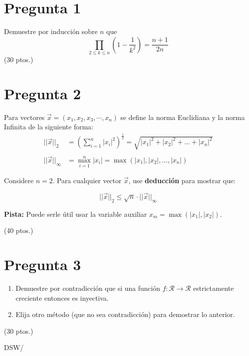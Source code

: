 \documentclass[spanish, fleqn]{article}
\title{Estructuras Discretas \\
       Tarea \#\num \\
       ``Demuestre que sabe demostrar''}
\author{Discrete Structure Warriors}
\date{}
\begin{document}
\maketitle
\thispagestyle{empty}

\section*{Pregunta 1}
Demuestre por inducción sobre \(n\) que
\[
\prod_{2 \leq k \leq n} \left( 1 - \frac{1}{k^2} \right) = \frac{n+1}{2n}
\]
\hfill (30 ptos.)

\section*{Pregunta 2}
Para vectores \( \vec{x} = (x_1, x_2, x_3, \cdots, x_n) \) se define la norma Euclidiana y la norma Infinita de la siguiente forma:
\begin{align*}
	|| \vec{x} ||_2 &= 
    \left(
    \sum_{i=1}^{n} | x_i |^2
    \right)^\frac{1}{2}  = \sqrt{|x_1|^2+|x_2|^2+ ... + |x_n|^2}\\
    &\\
    || \vec{x} ||_{\infty} &= 
    \max_{i=1}^{n} |x_i| =  \max(|x_1|,|x_2|,...,|x_n|) 
\end{align*}

Considere \(n = 2\). Para cualquier vector \( \vec{x} \), use \textbf{deducción} para mostrar que:

\[
|| \vec{x} ||_2 \leq \sqrt{n} \cdot  || \vec{x} ||_{\infty}
\]

\textbf{Pista:} Puede serle útil usar la variable auxiliar \(x_m = \max(|x_1|, |x_2|)\).

\hfill (40 ptos.)

\section*{Pregunta 3}
\begin{enumerate}
\item Demuestre por contradicción que si una función \(f: \mathcal{R} \rightarrow \mathcal{R}\) estrictamente creciente entonces es inyectiva.\\

\item Elija otro método  (que no sea contradicción) para demostrar lo anterior.
\end{enumerate}


\hfill (30 ptos.)


  \vfill\hfill DSW/\LaTeXe
\end{document}
